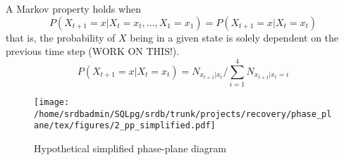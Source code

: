 \documentclass[a4paper,12pt]{article}
\begin{document}
A Markov property holds when 
\begin{equation}
 P(X_{t+1}=x|X_{t}=x_{t},\ldots,X_{1}=x_{1})= P(X_{t+1}=x|X_{t}=x_{t})
\end{equation}
that is, the probability of $X$ being in a given state is solely dependent on the previous time step (WORK ON THIS!).
 \begin{equation}
P(X_{t+1}=x|X_{t}=x_{t})=N_{x_{t+1}|x_{t}}/\displaystyle{\sum_{i=1}^4} N_{x_{t+1}|x_{t}=i}
  \end{equation}

\begin{figure}
\begin{center}
 \texttt{[image: /home/srdbadmin/SQLpg/srdb/trunk/projects/recovery/phase\_plane/tex/figures/2\_pp\_simplified.pdf]}	
\caption{Hypothetical simplified phase-plane diagram}
\end{center}
\label{fig:simplified_pp}
\end{figure} 
\end{document}
